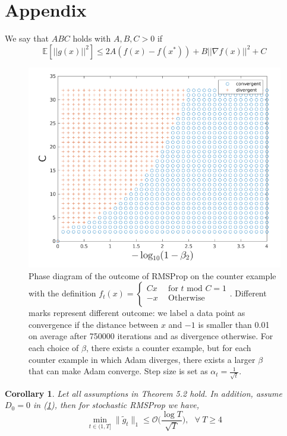 \documentclass{article}
\newtheorem{corollary}{Corollary}[section]
\begin{document}
\section{Appendix}\label{app:Appendix}
We say that $ABC$ holds with $A,B,C > 0$ if
\begin{equation}\label{eqa1}
	\mathbb{E}\left[||g(x)||^2\right] \leq 2A(f(x) - f(x^*)) + B||\nabla f(x)||^2 + C\tag{A.1}
\end{equation}
\begin{figure}[h]
\label{fig1}
\centering
\includegraphics[scale = 0.4]{rmsp.png}
\caption{Phase diagram of the outcome of RMSProp on the counter example with the definition
			\(f_t(x) =
	\begin{cases}
		Cx & \ \ \text{for $t$ mod $C = 1$}\\
		-x & \ \ \text{Otherwise}\\
	\end{cases}
	\). 
	Different marks represent
	different outcome: we label a data point as convergence if the distance between $x$ and $-1$ is smaller than 0.01
	on average after 750000 iterations and as divergence otherwise. For each choice of $\beta$, there exists a counter
	example, but for each counter example in which Adam diverges, there exists a larger $\beta$ that can make Adam
	converge. Step size is set as $\alpha_t = \frac{1}{\sqrt{t}}$.}
\end{figure}
\begin{corollary}
	\label{coro51appendix}
	Let all assumptions in Theorem 5.2 hold. In addition, assume $D_0 = 0$ in (\hyperref[eq51]{1}), then for stochastic RMSProp we have,
	\[
	\min_{t \in (1, T]} \|\tilde{g}_t\|_1 \leq \mathcal{O}\Big(\frac{\log T}{\sqrt{T}}\Big), \ \ \ \forall \ T \geq 4
	\]
\end{corollary}
\end{document}
